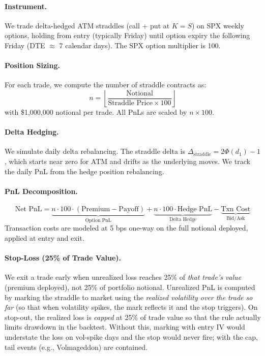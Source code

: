 \documentclass[11pt,a4paper]{article}
\begin{document}
\paragraph{Instrument.}
We trade delta-hedged ATM straddles (call + put at $K = S$) on SPX weekly options, holding from entry (typically Friday) until option expiry the following Friday (DTE $\approx$ 7 calendar days). The SPX option multiplier is 100.

\paragraph{Position Sizing.}
For each trade, we compute the number of straddle contracts as:
\begin{equation}
    n = \left\lfloor \frac{\text{Notional}}{\text{Straddle Price} \times 100} \right\rfloor
\end{equation}
with \$1,000,000 notional per trade. All PnLs are scaled by $n \times 100$.

\paragraph{Delta Hedging.}
We simulate daily delta rebalancing.
The straddle delta is $\Delta_{\text{straddle}} = 2\Phi(d_1) - 1$, which starts near zero for ATM and drifts as the underlying moves.
We track the daily PnL from the hedge position rebalancing.

\paragraph{PnL Decomposition.}
\begin{equation}
    \text{Net PnL} = \underbrace{n \cdot 100 \cdot (\text{Premium} - \text{Payoff})}_{\text{Option PnL}} + \underbrace{n \cdot 100 \cdot \text{Hedge PnL}}_{\text{Delta Hedge}} - \underbrace{\text{Txn Cost}}_{\text{Bid/Ask}}
\end{equation}
Transaction costs are modeled at 5 bps one-way on the full notional deployed, applied at entry and exit.

\paragraph{Stop-Loss (25\% of Trade Value).}
We exit a trade early when unrealized loss reaches 25\% of \emph{that trade's value} (premium deployed), not 25\% of portfolio notional.
Unrealized PnL is computed by marking the straddle to market using the \emph{realized volatility over the trade so far} (so that when volatility spikes, the mark reflects it and the stop triggers).
On stop-out, the realized loss is \emph{capped} at 25\% of trade value so that the rule actually limits drawdown in the backtest.
Without this, marking with entry IV would understate the loss on vol-spike days and the stop would never fire; with the cap, tail events (e.g., Volmageddon) are contained.
\end{document}
